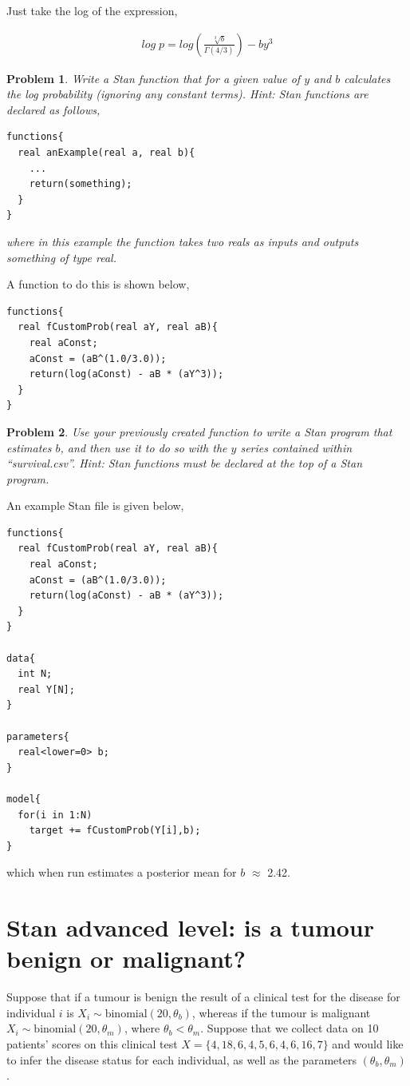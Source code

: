 \documentclass{article}
\newtheorem{problem}{Problem}[section]
\begin{document}
Just take the log of the expression,

\begin{align}
log\; p = log\left(\frac{\sqrt[3]{b}}{\Gamma(4/3)}\right) - b y^3
\end{align}

\begin{problem}
	Write a Stan function that for a given value of $y$ and $b$ calculates the log probability (ignoring any constant terms). Hint: Stan functions are declared as follows,
	
\begin{verbatim}
functions{
  real anExample(real a, real b){
    ...
    return(something);
  }
}
\end{verbatim}
	
	where in this example the function takes two reals as inputs and outputs something of type real.
\end{problem}

A function to do this is shown below,

\begin{verbatim}
functions{
  real fCustomProb(real aY, real aB){
    real aConst;
    aConst = (aB^(1.0/3.0));
    return(log(aConst) - aB * (aY^3));
  }
}
\end{verbatim}

\begin{problem}
Use your previously created function to write a Stan program that estimates $b$, and then use it to do so with the $y$ series contained within ``survival.csv''. Hint: Stan functions must be declared at the top of a Stan program.
\end{problem}

An example Stan file is given below,

\begin{verbatim}
functions{
  real fCustomProb(real aY, real aB){
    real aConst;
    aConst = (aB^(1.0/3.0));
    return(log(aConst) - aB * (aY^3));
  }
}

data{
  int N;
  real Y[N];
}

parameters{
  real<lower=0> b;
}

model{
  for(i in 1:N)
    target += fCustomProb(Y[i],b);
}
\end{verbatim}

which when run estimates a posterior mean for $b$ $\approx$ 2.42.

\section{Stan advanced level: is a tumour benign or malignant?}
Suppose that if a tumour is benign the result of a clinical test for the disease for individual $i$ is $X_i\sim \text{binomial}(20,\theta_b)$, whereas if the tumour is malignant $X_i\sim \text{binomial}(20,\theta_m)$, where $\theta_b < \theta_m$. Suppose that we collect data on 10 patients' scores on this clinical test $X=\{4,18,6,4,5,6,4,6,16,7\}$ and would like to infer the disease status for each individual, as well as the parameters $(\theta_b,\theta_m)$.
\end{document}
